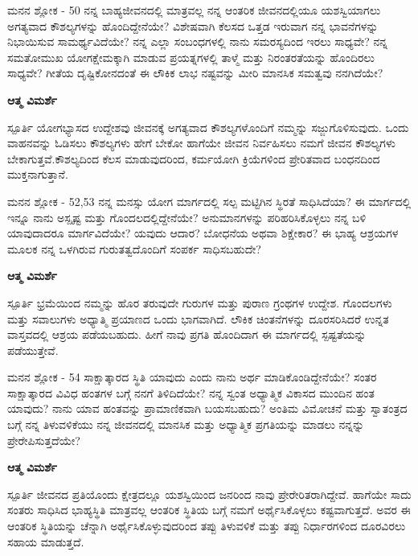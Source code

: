 \newpage
\begin{mananam}{\kanfont ಮನನ ಶ್ಲೋಕ - \textenglish{50}}
\footnotesize \mananamfont ನನ್ನ ಬಾಹ್ಯಜೀವನದಲ್ಲಿ ಮಾತ್ರವಲ್ಲ ನನ್ನ ಆಂತರಿಕ ಜೀವನದಲ್ಲಿಯೂ ಯಶಸ್ವಿಯಾಗಲು ಅಗತ್ಯವಾದ ಕೌಶಲ್ಯಗಳನ್ನು ಹೊಂದಿದ್ದೇನೆಯೇ? ವಿಶೇಷವಾಗಿ ಕೆಲಸದ ಒತ್ತಡ ಇರುವಾಗ ನನ್ನ ಭಾವನೆಗಳನ್ನು ನಿಭಾಯಿಸುವ ಸಾಮರ್ಥ್ಯವಿದೆಯೇ? ನನ್ನ ಎಲ್ಲಾ ಸಂಬಂಧಗಳಲ್ಲಿ ನಾನು  ಸಮರಸ್ಯದಿಂದ ಇರಲು ಸಾಧ್ಯವೇ? ನನ್ನ ಸಮತೋಮುಖ ಯೋಗಕ್ಷೇಮಕ್ಕಾಗಿ ಮಾಡುವ ಪ್ರಯತ್ನಗಳಲ್ಲಿ ತಾಳ್ಮೆ ಮತ್ತು ನಿರಂತರತೆಯನ್ನು ಹೊಂದಿರಲು ಸಾಧ್ಯವೇ? ಗೀತೆಯ ದೃಷ್ಟಿಕೋನದಂತೆ ಈ ಲೌಕಿಕ ಲಾಭ ನಷ್ಟವನ್ನು ಮೀರಿ ಮಾನಸಿಕ ಸಮತ್ವವು ನನಗಿದೆಯೇ?
\end{mananam}
\WritingHand\enspace\textbf{ಆತ್ಮ ವಿಮರ್ಶೆ}
\begin{inspiration}{\kanfont ಸ್ಪೂರ್ತಿ}
\footnotesize \mananamfont ಯೋಗಭ್ಯಾಸದ ಉದ್ದೇಶವು ಜೀವನಕ್ಕೆ ಅಗತ್ಯವಾದ ಕೌಶಲ್ಯಗಳೊಂದಿಗೆ ನಮ್ಮನ್ನು ಸಜ್ಜುಗೊಳಿಸುವುದು. ಒಂದು ವಾಹನವನ್ನು ಓಡಿಸಲು ಕೌಶಲ್ಯಗಳು ಹೇಗೆ ಬೇಕೋ ಹಾಗೆಯೇ ಜೀವನ ನಿರ್ವಹಿಸಲು ನಮಗೆ ಜೀವನ ಕೌಶಲ್ಯಗಳು ಬೇಕಾಗುತ್ತವೆ.ಕೌಶಲ್ಯದಿಂದ ಕೆಲಸ ಮಾಡುವುದರಿಂದ, ಕರ್ಮಯೋಗಿ ಕ್ರಿಯೆಗಳಿಂದ ಪ್ರೇರಿತವಾದ ಬಂಧನದಿಂದ ಮುಕ್ತನಾಗುತ್ತಾನೆ.
\end{inspiration}
\newpage



\newpage
\begin{mananam}{\kanfont ಮನನ ಶ್ಲೋಕ - \textenglish{52,53}}
\footnotesize \mananamfont ನನ್ನ ಮನಸ್ಸು ಯೋಗ ಮಾರ್ಗದಲ್ಲಿ ಸಲ್ಪ ಮಟ್ಟಿಗಿನ ಸ್ಥಿರತೆ ಸಾಧಿಸಿದೆಯಾ? ಈ ಮಾರ್ಗದಲ್ಲಿ ಇನ್ನೂ ನಾನು ಅಸ್ಪೃಷ್ಟ  ಮತ್ತು ಗೊಂದಲದಲ್ಲಿದ್ದೇನೆಯೇ? ಅನುಮಾನಗಳನ್ನು ಪರಿಹರಿಸಿಕೊಳ್ಳಲು ನನ್ನ ಬಳಿ ಯಾವುದಾದರೂ ಮಾರ್ಗವಿದೆಯೇ? ಯವುದು ಆದಾರ? ಬೋಧನೆಯ ಅಥವಾ ಶಿಕ್ಷೇಕಾರ? ಈ ಭಾಹ್ಯ ಆಶ್ರಯಗಳ ಮೂಲಕ ನನ್ನ ಒಳಗಿರುವ ಗುರುತತ್ವದೊಂದಿಗೆ ಸಂಪರ್ಕ ಸಾಧಿಸಬಹುದೇ?
\end{mananam}
\WritingHand\enspace\textbf{ಆತ್ಮ ವಿಮರ್ಶೆ}
\begin{inspiration}{\kanfont ಸ್ಪೂರ್ತಿ}
\footnotesize \mananamfont ಭ್ರಮೆಯಿಂದ ನಮ್ಮನ್ನು ಹೊರ ತರುವುದೇ ಗುರುಗಳ ಮತ್ತು ಪುರಾಣ ಗ್ರಂಥಗಳ ಉದ್ದೇಶ. ಗೊಂದಲಗಳು ಮತ್ತು ಸವಾಲುಗಳು ಅಧ್ಯಾತ್ಮಿ ಪ್ರಯಾಣದ ಒಂದು ಭಾಗವಾಗಿದೆ. ಲೌಕಿಕ ಚಿಂತನೆಗಳನ್ನು ದೂರಸರಿಸಿದರೆ ಉನ್ನತ ವಾಸ್ತವದಲ್ಲಿ ಆಶ್ರಯ ಪಡೆಯಬಹುದು. ಹೀಗೆ ನಾವು ಪ್ರಗತಿ ಹೊಂದಿದಾಗ ಈ ಮಾರ್ಗದಲ್ಲಿ ಸ್ಪಷ್ಟತೆಯನ್ನು ಪಡೆಯುತ್ತೇವೆ.
\end{inspiration}
\newpage



\newpage
\begin{mananam}{\kanfont ಮನನ ಶ್ಲೋಕ - \textenglish{54}}
\footnotesize \mananamfont ಸಾಕ್ಷಾತ್ಕಾರದ ಸ್ಥಿತಿ ಯಾವುದು ಎಂದು ನಾನು ಅರ್ಥ ಮಾಡಿಕೊಂಡಿದ್ದೇನೆಯೇ? ಸಂತರ ಸಾಕ್ಷಾತ್ಕಾರದ  ವಿವಿಧ ಹಂತಗಳ ಬಗ್ಗೆ ನನಗೆ ತಿಳಿದಿದೆಯೇ? ನನ್ನ ಸ್ವಂತ ಅಧ್ಯಾತ್ಮಿಕ ವಿಕಾಸದ ಮುಂದಿನ ಹಂತ ಯಾವುದು? ನಾನು ಯಾವ ಹಂತವನ್ನು ಪ್ರಾಮಾಣಿಕವಾಗಿ ಬಯಸಬಹುದು? ಅಂತಿಮ ವಿಮೋಚನೆ ಮತ್ತು ಸ್ವಾತಂತ್ರದ ಬಗ್ಗೆ ನನ್ನ ತಿಳುವಳಿಕೆಯು ನನ್ನ ಜೀವನದಲ್ಲಿ ಮಾನಸಿಕ ಮತ್ತು ಅಧ್ಯಾತ್ಮಿಕ ಪ್ರಗತಿಯನ್ನು ಮಾಡಲು  ನನ್ನನ್ನು ಪ್ರೇರೇಪಿಸುತ್ತದೆಯೇ?
\end{mananam}
\WritingHand\enspace\textbf{ಆತ್ಮ ವಿಮರ್ಶೆ}
\begin{inspiration}{\kanfont ಸ್ಪೂರ್ತಿ}
\footnotesize \mananamfont
 ಜೀವನದ ಪ್ರತಿಯೊಂದು ಕ್ಷೇತ್ರದಲ್ಲೂ ಯಶಸ್ವಿಯಿಂದ ಜನರಿಂದ ನಾವು ಪ್ರೇರೇರಿತರಾಗಿದ್ದೇವೆ. ಹಾಗೆಯೇ ಸಾದು ಸಂತರು ಸಾಧಿಸಿದ ಭಾಹ್ಯಸ್ಥಿತಿ ಮಾತ್ರವಲ್ಲ ಆಂತರಿಕ ಸ್ಥಿತಿಯ ಬಗ್ಗೆ ನಮಗೆ ಅರ್ಥೈಸಿಕೊಳ್ಳಲು ಕಷ್ಟವಾಗುತ್ತದೆ. ಅವರ ಈ ಆಂತರಿಕ ಸ್ಥಿತಿಯನ್ನು ಚೆನ್ನಾಗಿ ಅರ್ಥೈಸಿಕೊಳ್ಳುವುದರಿಂದ ತಪ್ಪು ತಿಳುವಳಿಕೆ ಮತ್ತು ತಪ್ಪು ನಿರ್ಧಾರಗಳಿಂದ ದೂರವಿರಲು ಸಹಾಯ ಮಾಡುತ್ತದೆ.
\end{inspiration}
\newpage



